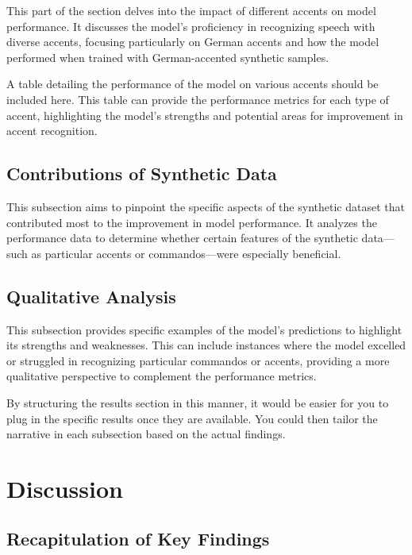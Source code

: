\documentclass[
]{article}
\begin{document}
This part of the section delves into the impact of different accents on
model performance. It discusses the model's proficiency in recognizing
speech with diverse accents, focusing particularly on German accents and
how the model performed when trained with German-accented synthetic
samples.

A table detailing the performance of the model on various accents should
be included here. This table can provide the performance metrics for
each type of accent, highlighting the model's strengths and potential
areas for improvement in accent recognition.

\hypertarget{contributions-of-synthetic-data}{%
\subsection{Contributions of Synthetic
Data}\label{contributions-of-synthetic-data}}

This subsection aims to pinpoint the specific aspects of the synthetic
dataset that contributed most to the improvement in model performance.
It analyzes the performance data to determine whether certain features
of the synthetic data---such as particular accents or commandos---were
especially beneficial.

\hypertarget{qualitative-analysis}{%
\subsection{Qualitative Analysis}\label{qualitative-analysis}}

This subsection provides specific examples of the model's predictions to
highlight its strengths and weaknesses. This can include instances where
the model excelled or struggled in recognizing particular commandos or
accents, providing a more qualitative perspective to complement the
performance metrics.

By structuring the results section in this manner, it would be easier
for you to plug in the specific results once they are available. You
could then tailor the narrative in each subsection based on the actual
findings.

\hypertarget{discussion}{%
\section{Discussion}\label{discussion}}

\hypertarget{recapitulation-of-key-findings}{%
\subsection{Recapitulation of Key
Findings}\label{recapitulation-of-key-findings}}
\end{document}
